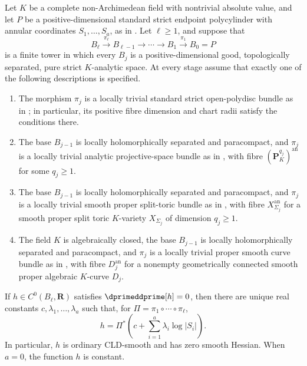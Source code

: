 \begin{theorem}
\label{thm:p213-endpoint-mixed-tower-classification}
Let \(K\) be a complete non-Archimedean field with nontrivial absolute
value, and let \(P\) be a positive-dimensional standard strict endpoint
polycylinder with annular coordinates \(S_1,\ldots,S_a\), as in
.  Let \(\ell\geq1\), and
suppose that
\[
 B_\ell\xrightarrow{\pi_\ell}B_{\ell-1}
 \longrightarrow\cdots\longrightarrow B_1
 \xrightarrow{\pi_1}B_0=P
\]
is a finite tower in which every \(B_j\) is a positive-dimensional good,
topologically separated, pure strict \(K\)-analytic space.  At every stage
assume that exactly one of the following descriptions is specified.
\begin{enumerate}
\item The morphism \(\pi_j\) is a locally trivial standard strict
open-polydisc bundle as in
; in particular, its positive
fibre dimension and chart radii satisfy the conditions there.
\item The base \(B_{j-1}\) is locally holomorphically separated and
paracompact, and \(\pi_j\) is a locally trivial analytic projective-space
bundle as in , with fibre
\((\mathbf P_K^{q_j})^{\mathrm{an}}\) for some \(q_j\geq1\).
\item The base $B_{j-1}$ is locally holomorphically separated and
paracompact, and $\pi_j$ is a locally trivial smooth proper split-toric
bundle as in
, with fibre
$X_{\Sigma_j}^{\mathrm{an}}$ for a smooth proper split toric $K$-variety
$X_{\Sigma_j}$ of dimension $q_j\geq1$.
\item The field \(K\) is algebraically closed, the base \(B_{j-1}\) is
locally holomorphically separated and paracompact, and \(\pi_j\) is a
locally trivial proper smooth curve bundle as in
, with fibre
\(D_j^{\mathrm{an}}\) for a nonempty geometrically connected smooth proper
algebraic \(K\)-curve \(D_j\).
\end{enumerate}
If \(h\in C^0(B_\ell,\mathbf R)\) satisfies
\(\dprimeddprime[h]=0\), then there are unique real constants
\(c,\lambda_1,\ldots,\lambda_a\) such that, for
\(\Pi=\pi_1\circ\cdots\circ\pi_\ell\),
\begin{equation}
\label{eq:p213-endpoint-mixed-tower-classification}
 h=\Pi^*\left(c+\sum_{i=1}^a\lambda_i\log|S_i|\right).
\end{equation}
In particular, \(h\) is ordinary CLD-smooth and has zero smooth Hessian.
When \(a=0\), the function \(h\) is constant.
\end{theorem}
